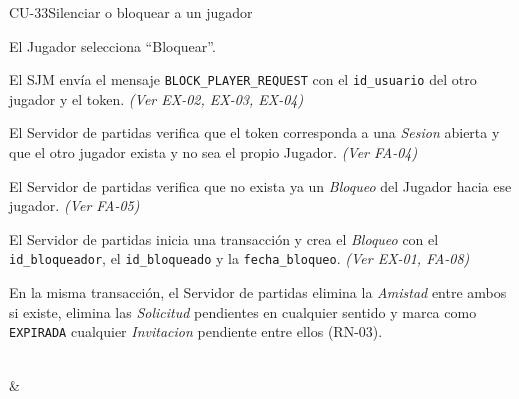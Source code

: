 \begin{fichacu}{CU-33}{Silenciar o bloquear a un jugador}
{\begin{cuenum}[start=1]
      \item El Jugador selecciona ``Bloquear''.
      \item El SJM envía el mensaje \texttt{BLOCK\_\allowbreak{}PLAYER\_\allowbreak{}REQUEST} con el \texttt{id\_\allowbreak{}usuario} del otro jugador y el token. \textit{(Ver \mbox{EX-02}, \mbox{EX-03}, \mbox{EX-04})}
      \item El Servidor de partidas verifica que el token corresponda a una \textit{Sesion} abierta y que el otro jugador exista y no sea el propio Jugador. \textit{(Ver \mbox{FA-04})}
      \item El Servidor de partidas verifica que no exista ya un \textit{Bloqueo} del Jugador hacia ese jugador. \textit{(Ver \mbox{FA-05})}
      \item El Servidor de partidas inicia una transacción y crea el \textit{Bloqueo} con el \texttt{id\_\allowbreak{}bloqueador}, el \texttt{id\_\allowbreak{}bloqueado} y la \texttt{fecha\_\allowbreak{}bloqueo}. \textit{(Ver \mbox{EX-01}, \mbox{FA-08})}
      \item En la misma transacción, el Servidor de partidas elimina la \textit{Amistad} entre ambos si existe, elimina las \textit{Solicitud} pendientes en cualquier sentido y marca como \texttt{EXPIRADA} cualquier \textit{Invitacion} pendiente entre ellos (\mbox{RN-03}).
    \end{cuenum}} \\
   &  \\ \hline

\end{fichacu}
